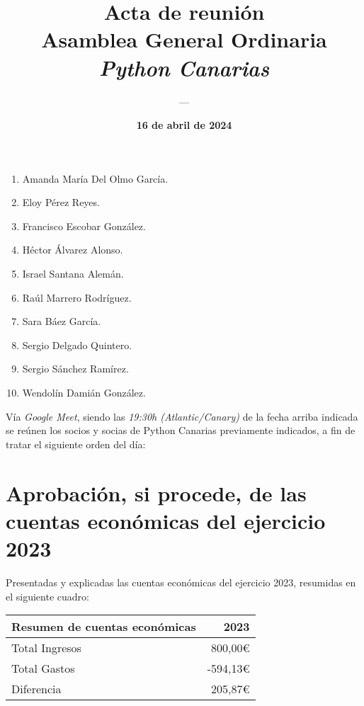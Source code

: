 \documentclass[a4paper,12pt]{article}
\title{\huge \textbf{Acta de reunión} \\ Asamblea General Ordinaria \\ \textit{Python Canarias}}
\date{\textbf{16 de abril de 2024}}
\author{---}
\begin{document}
\renewcommand{\contentsname}{Orden del día}

\maketitle

\begin{enumerate}
    \item Amanda María Del Olmo García.
    \item Eloy Pérez Reyes.
    \item Francisco Escobar González.
    \item Héctor Álvarez Alonso.
    \item Israel Santana Alemán.
    \item Raúl Marrero Rodríguez.
    \item Sara Báez García.
    \item Sergio Delgado Quintero.
    \item Sergio Sánchez Ramírez.
    \item Wendolín Damián González.
\end{enumerate}

Vía \textit{Google Meet}, siendo las \textit{19:30h (Atlantic/Canary)} de la fecha arriba indicada se reúnen los socios y socias de Python Canarias previamente indicados, a fin de tratar el siguiente orden del día:

\tableofcontents

\vspace{1cm}

\section{Aprobación, si procede, de las cuentas económicas del ejercicio 2023}

Presentadas y explicadas las cuentas económicas del ejercicio 2023, resumidas en el siguiente cuadro:

\begin{center}
    \begin{tabular}{ | l | r | }
        \hline
        \textbf{Resumen de cuentas económicas} & \textbf{2023} \\ 
        \hline
        Total Ingresos & 800,00\euro \\  
        \hline
        Total Gastos & -594,13\euro \\  
        \hline
        \hline
        Diferencia & 205,87\euro \\  
        \hline
    \end{tabular}
\end{center}
\end{document}
